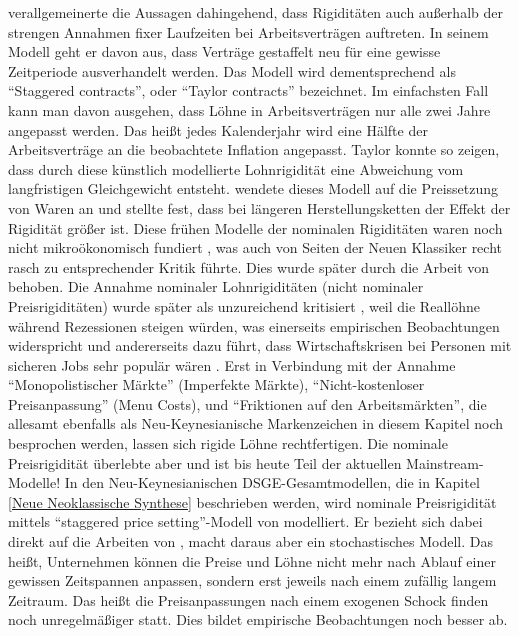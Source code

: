 \textcite{Taylor1979, Taylor1980} verallgemeinerte die Aussagen dahingehend, dass Rigiditäten auch außerhalb der strengen Annahmen fixer Laufzeiten bei Arbeitsverträgen auftreten. In seinem Modell geht er davon aus, dass Verträge gestaffelt neu für eine gewisse Zeitperiode ausverhandelt werden. Das Modell wird dementsprechend als "`Staggered contracts"', oder "`Taylor contracts"' bezeichnet. Im einfachsten Fall kann man davon ausgehen, dass Löhne in Arbeitsverträgen nur alle zwei Jahre angepasst werden. Das heißt jedes Kalenderjahr wird eine Hälfte der Arbeitsverträge an die beobachtete Inflation angepasst. Taylor konnte so zeigen, dass durch diese künstlich modellierte Lohnrigidität eine Abweichung vom langfristigen Gleichgewicht entsteht. \textcite{Blanchard1983} wendete dieses Modell auf die Preissetzung von Waren an und stellte fest, dass bei längeren Herstellungsketten der Effekt der Rigidität größer ist. Diese frühen Modelle der nominalen Rigiditäten waren noch nicht mikroökonomisch fundiert \parencite[S. 194]{Fischer1977}, was auch von Seiten der Neuen Klassiker recht rasch zu entsprechender Kritik führte. Dies wurde später durch die Arbeit von \textcite{Rotemberg1987} behoben. Die Annahme nominaler Lohnrigiditäten (nicht nominaler Preisrigiditäten) wurde später als unzureichend kritisiert \parencite{Mankiw1990}, weil die Reallöhne während Rezessionen steigen würden, was einerseits empirischen Beobachtungen widerspricht und andererseits dazu führt, dass Wirtschaftskrisen bei Personen mit sicheren Jobs sehr populär wären \parencite[S. 371]{Snowdon2005}. Erst in Verbindung mit der Annahme "`Monopolistischer Märkte"' (Imperfekte Märkte), "`Nicht-kostenloser Preisanpassung"' (Menu Costs), und "`Friktionen auf den Arbeitsmärkten"', die allesamt ebenfalls als Neu-Keynesianische Markenzeichen in diesem Kapitel noch besprochen werden, lassen sich rigide Löhne rechtfertigen.
Die nominale Preisrigidität überlebte aber und ist bis heute Teil der aktuellen Mainstream-Modelle! In den  Neu-Keynesianischen DSGE-Gesamtmodellen, die in Kapitel \ref{Neue Neoklassische Synthese} beschrieben werden, wird nominale Preisrigidität mittels "`staggered price setting"'-Modell von \textcite{Calvo1983} modelliert. Er bezieht sich dabei direkt auf die Arbeiten von \textcite{Taylor1979, Taylor1980}, macht daraus aber ein stochastisches Modell. Das heißt, Unternehmen können die Preise und Löhne nicht mehr nach Ablauf einer gewissen Zeitspannen anpassen, sondern erst jeweils nach einem zufällig langem Zeitraum. Das heißt die Preisanpassungen nach einem exogenen Schock finden noch unregelmäßiger statt. Dies bildet empirische Beobachtungen noch besser ab. 

